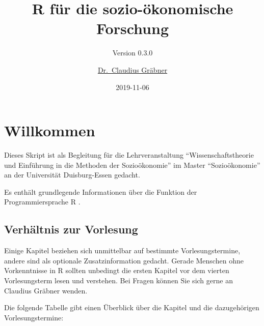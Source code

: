 \documentclass[]{book}
\title{R für die sozio-ökonomische Forschung}
\subtitle{Version 0.3.0}
\author{\href{http://claudius-graebner.com/}{Dr.~Claudius Gräbner}}
\date{2019-11-06}
\begin{document}
\maketitle

{
\setcounter{tocdepth}{1}
\tableofcontents
}
\chapter*{Willkommen}\label{willkommen}

Dieses Skript ist als Begleitung für die Lehrveranstaltung
``Wissenschaftstheorie und Einführung in die Methoden der
Sozioökonomie'' im Master ``Sozioökonomie'' an der Universität
Duisburg-Essen gedacht.

Es enthält grundlegende Informationen über die Funktion der
Programmiersprache R \citep{R-Team}.

\section*{Verhältnis zur Vorlesung}\label{verhaltnis-zur-vorlesung}

Einige Kapitel beziehen sich unmittelbar auf bestimmte
Vorlesungstermine, andere sind als optionale Zusatzinformation gedacht.
Gerade Menschen ohne Vorkenntnisse in R sollten unbedingt die ersten
Kapitel vor dem vierten Vorlesungsterm lesen und verstehen. Bei Fragen
können Sie sich gerne an Claudius Gräbner wenden.

Die folgende Tabelle gibt einen Überblick über die Kapitel und die
dazugehörigen Vorlesungstermine:
\end{document}
